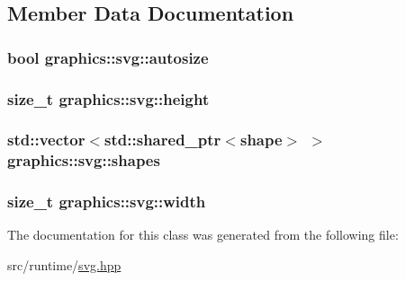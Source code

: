 \subsection{Member Data Documentation}
\subsubsection[{\texorpdfstring{autosize}{autosize}}]{\setlength{\rightskip}{0pt plus 5cm}bool graphics\+::svg\+::autosize\hspace{0.3cm}{\ttfamily [private]}}\hypertarget{classgraphics_1_1svg_aced594862a8a681a6310985ea174a60e}{}\label{classgraphics_1_1svg_aced594862a8a681a6310985ea174a60e}
\subsubsection[{\texorpdfstring{height}{height}}]{\setlength{\rightskip}{0pt plus 5cm}size\+\_\+t graphics\+::svg\+::height\hspace{0.3cm}{\ttfamily [private]}}\hypertarget{classgraphics_1_1svg_ae536c6f9d7071034b9f4c3555b752815}{}\label{classgraphics_1_1svg_ae536c6f9d7071034b9f4c3555b752815}
\subsubsection[{\texorpdfstring{shapes}{shapes}}]{\setlength{\rightskip}{0pt plus 5cm}std\+::vector$<$std\+::shared\+\_\+ptr$<${\bf shape}$>$ $>$ graphics\+::svg\+::shapes\hspace{0.3cm}{\ttfamily [private]}}\hypertarget{classgraphics_1_1svg_a201d99b8b9e654c80a11dd0678f5d224}{}\label{classgraphics_1_1svg_a201d99b8b9e654c80a11dd0678f5d224}
\subsubsection[{\texorpdfstring{width}{width}}]{\setlength{\rightskip}{0pt plus 5cm}size\+\_\+t graphics\+::svg\+::width\hspace{0.3cm}{\ttfamily [private]}}\hypertarget{classgraphics_1_1svg_ad69af0bdb11e7d1871dd405673445d65}{}\label{classgraphics_1_1svg_ad69af0bdb11e7d1871dd405673445d65}


The documentation for this class was generated from the following file\+:\begin{DoxyCompactItemize}
\item 
src/runtime/\hyperlink{svg_8hpp}{svg.\+hpp}\end{DoxyCompactItemize}
